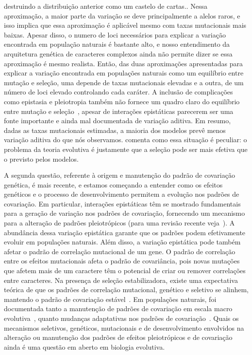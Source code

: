 \begin{refsection}
{destruindo a distribuição anterior como um castelo de cartas.}. Nessa
aproximação, a maior parte da variação se deve principalmente a alelos raros,
e isso implica que essa aproximação é aplicável mesmo com taxas mutacionais
mais baixas. Apesar disso, o numero de loci necessários para explicar a
variação encontrada em população naturais é bastante alto, e nosso
entendimento da arquitetura genética de caracteres complexos ainda não permite
dizer se essa aproximação é mesmo realista. Então, das duas aproximações
apresentadas para explicar a variação encontrada em populações naturais como
um equilíbrio entre mutação e seleção, uma depende de taxas mutacionais
elevadas e a outra, de um número de loci elevado controlando cada caráter. A
inclusão de complicações como epistasia e pleiotropia também não fornece um
quadro claro do equilíbrio entre mutação e seleção~\parencite{Turelli1985-ne},
apesar de interações epistáticas parecerem ser uma fonte importante e ainda
mal documentada de variação aditiva. Em resumo, dadas as taxas mutacionais
estimadas, a maioria dos modelos prevê menos variação aditiva do que nós
observamos. \textcite{Rice2004-jf} comenta como essa situação é peculiar: o
problema da teoria evolutiva é justamente que a seleção pode ser mais efetiva
que o previsto pelos modelos.

A segunda questão, referente à origem e manutenção do padrão de covariação
genética, é mais recente, e estamos começando a entender como os efeitos
genéticos e o processo de desenvolvimento permitem a evolução nos padrões de
covariação. Em particular, interações epistáticas têm se mostrado fundamentais
para a geração de variação nos padrões de covariação, fornecendo um mecanismo
para a alteração de padrões pleiotrópicos (para uma revisão recente
veja~\textcite{Pavlicev2015-up}). A abundância dessa variação epistática
garante que os padrões podem efetivamente evoluir em populações naturais. Além
disso, a variação epistática pode também afetar o padrão de correlação
mutacional de um gene. O padrão de correlação entre os efeitos mutacionais
afeta o padrão de covariância, pois novas mutações que afetem mais de um
caractere têm o potencial de criar ou remover correlações entre caracteres. Na
presença de seleção estabilizadora, existe uma expectativa teórica de que os
padrões de correlação mutacional, genético e seletivo se alinhem, mantendo o
padrão de covariação estável~\parencite{Cheverud1984-mi}. Em populações
naturais, foi documentada tanto a manutenção de padrões de covariação em
escala macro evolutiva~\parencite{Marroig2001-ne}, quanto mudanças adaptativas
nos padrões de covariação~\parencite{Young2005-nk}. Quais os mecanismos
seletivos, genéticos, mutacionais e de desenvolvimento envolvidos na alteração
ou manutenção dos padrões de efeitos pleiotrópicos e de covariação ainda é uma
questão em aberto em biologia evolutiva.


\end{refsection}
